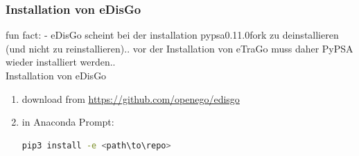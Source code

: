 \documentclass[
a4paper,     %
12pt         %
]{scrartcl}  %
\begin{document}
\subsubsection{Installation von eDisGo}
fun fact: - eDisGo scheint bei der installation pypsa0.11.0fork zu deinstallieren (und nicht zu reinstallieren).. vor der Installation von eTraGo muss daher PyPSA wieder installiert werden..\\

Installation von eDisGo
\begin{enumerate}
	\item download from \url{https://github.com/openego/edisgo}\\
	\item in Anaconda Prompt:
	\begin{lstlisting}[language=bash]
		pip3 install -e <path\to\repo>
	\end{lstlisting}



\end{enumerate}


\end{document}
